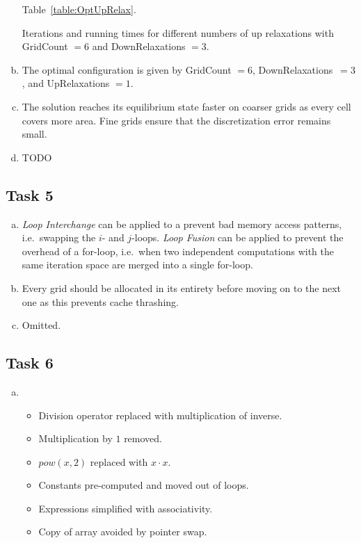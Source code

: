 \documentclass[11pt]{article}
\begin{document}
\begin{enumerate}[a)]
        Table~\ref{table:OptUpRelax}.
        \begin{table}[H]
            \caption{Iterations and running times for different numbers of up
            relaxations with GridCount $= 6$ and DownRelaxations $= 3$.}
            \begin{center}
                
            \end{center}
            \label{table:OptUpRelax}
        \end{table}
        \item The optimal configuration is given by GridCount $= 6$,
        \mbox{DownRelaxations $= 3$}, and UpRelaxations $= 1$.
        \item The solution reaches its equilibrium state faster on coarser
        grids as every cell covers more area.
        Fine grids ensure that the discretization error remains small.
        \item TODO
    \end{enumerate}

    \subsection*{Task 5}
    \label{subsec:Task5}

    \begin{enumerate}[a)]
        \item \textit{Loop Interchange} can be applied to a prevent bad
        memory access patterns, i.e.\ swapping the $i$- and $j$-loops.
        \textit{Loop Fusion} can be applied to prevent the overhead of a
        for-loop, i.e.\ when two independent computations with the same
        iteration space are merged into a single for-loop.
        \item Every grid should be allocated in its entirety before moving
        on to the next one as this prevents cache thrashing.
        \item Omitted.
    \end{enumerate}

    \subsection*{Task 6}
    \label{subsec:Task6}
    \begin{enumerate}[a)]
        \item \begin{itemize}
                  \item Division operator replaced with multiplication of
                  inverse.
                  \item Multiplication by $1$ removed.
                  \item $pow\left(x, 2\right)$ replaced with $x \cdot x$.
                  \item Constants pre-computed and moved out of loops.
                  \item Expressions simplified with associativity.
                  \item Copy of array avoided by pointer swap.
        \end{itemize}
    \end{enumerate}
\end{document}

